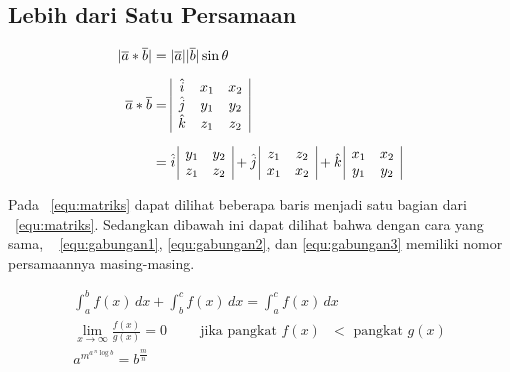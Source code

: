 \subsection{Lebih dari Satu Persamaan}
\label{sec:multiEqu}
\noindent \begin{align}\label{equ:matriks}	
	|\overline{a} * \overline{b}| &= |\overline{a}| |\overline{b}| \sin\theta 
	\\[0.2cm]
	\overline{a} * \overline{b} &=  
	\begin{array}{| c c c |}
		\hat{i} & x_{1} & x_{2} \\
		\hat{j} & y_{1} & y_{2} \\
		\hat{k} & z_{1} & z_{2} \\
	\end{array} \nonumber \\[0.2cm]
	&= \hat{i} \,
	\begin{array}{ | c c | }
		y_{1} & y_{2} \\
		z_{1} & z_{2} \\
	\end{array} 
	+ \hat{j} \,
	\begin{array}{ | c c | }
		z_{1} & z_{2} \\
		x_{1} & x_{2} \\
	\end{array} 
	+ \hat{k} \,	
	\begin{array}{ | c c | }
		x_{1} & x_{2} \\
		y_{1} & y_{2} \\
	\end{array}
	\nonumber
\end{align}

Pada \equ~\ref{equ:matriks} dapat dilihat beberapa baris menjadi satu bagian 
dari \equ~\ref{equ:matriks}. 
Sedangkan dibawah ini dapat dilihat bahwa dengan cara yang sama, \equ~
\ref{equ:gabungan1}, \ref{equ:gabungan2}, dan \ref{equ:gabungan3} memiliki nomor 
persamaannya masing-masing. 

\noindent \begin{align}\label{equ:gabungan1}	
	\int_{a}^{b} f(x)\, dx + \int_{b}^{c} f(x) \, dx = \int_{a}^{c} f(x) \, dx
	\\\label{equ:gabungan2}
	\lim_{x \to \infty} \frac{f(x)}{g(x)} = 0 \hspace{1cm} 
	\text{jika pangkat $f(x)$ $<$ pangkat $g(x)$} \\\label{equ:gabungan3}
	a^{m^{a \, ^{n}\log b }} = b^{\frac{m}{n}}
\end{align}



